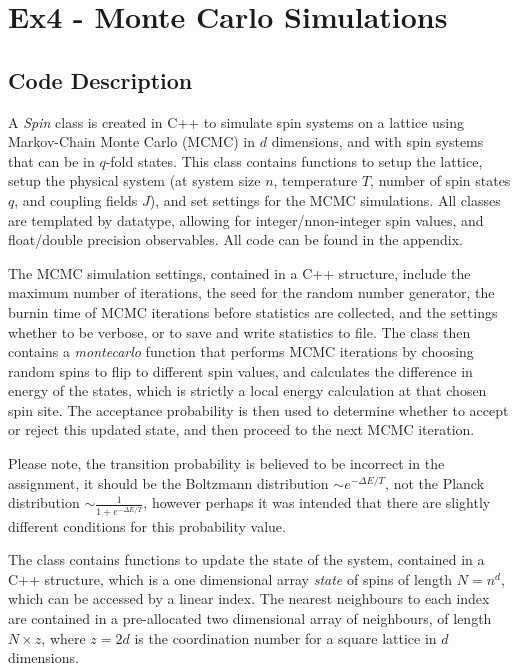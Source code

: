 \documentclass[12pt,letterpaper]{article}
\title{\large \doctitle}
\author{}
\date{}%
\begin{document}
\maketitle
\thispagestyle{fancy}
\singlespacing

\section{Ex4 - Monte Carlo Simulations}

\subsection{Code Description}
A \textit{Spin} class is created in C++ to simulate spin systems on a lattice using Markov-Chain Monte Carlo (MCMC) in $d$ dimensions, and with spin systems that can be in $q$-fold states. This class contains functions to setup the lattice, setup the physical system (at system size $n$, temperature $T$, number of spin states $q$, and coupling fields $J$), and set settings for the MCMC simulations. All classes are templated by datatype, allowing for integer/nnon-integer spin values, and float/double precision observables. All code can be found in the appendix.

The MCMC simulation settings, contained in a C++ structure, include the maximum number of iterations, the seed for the random number generator, the burnin time of MCMC iterations before statistics are collected, and the settings whether to be verbose, or to save and write statistics to file. The class then contains a \textit{montecarlo} function that performs MCMC iterations by choosing random spins to flip to different spin values, and calculates the difference in energy of the states, which is strictly a local energy calculation at that chosen spin site. The acceptance probability is then used to determine whether to accept or reject this updated state, and then proceed to the next MCMC iteration. 

Please note, the transition probability is believed to be incorrect in the assignment, it should be the Boltzmann distribution $\sim e^{-\Delta E/T}$, not the Planck distribution $\sim \frac{1}{1+e^{-\Delta E/T}}$, however perhaps it was intended that there are slightly different conditions for this probability value.

The class contains functions to update the state of the system, contained in a C++ structure, which is a one dimensional array \textit{state} of spins of length $N = n^d$, which can be accessed by a linear index. The nearest neighbours to each index are contained in a pre-allocated two dimensional array of neighbours, of length $N \times z$, where $z = 2d$ is the coordination number for a square lattice in $d$ dimensions. 
\end{document}
